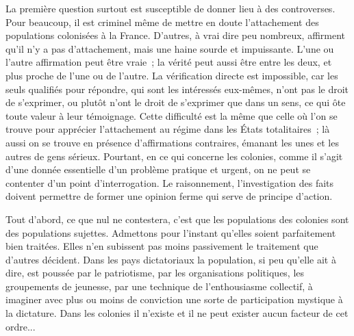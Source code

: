 \documentclass[french,twoside]{book} %
\begin{document}
La première question surtout est susceptible de donner lieu à des contro­verses. Pour beaucoup, il est criminel même de mettre en doute l'attachement des populations colonisées à la France. D'autres, à vrai dire peu nombreux, affirment qu'il n'y a pas d'attachement, mais une haine sourde et impuissante. L'une ou l'autre affirmation peut être vraie ; la vérité peut aussi être entre les deux, et plus proche de l'une ou de l'autre. La vérification directe est impos­sible, car les seuls qualifiés pour répondre, qui sont les intéressés eux-mêmes, n'ont pas le droit de s'exprimer, ou plutôt n'ont le droit de s'exprimer que dans un sens, ce qui ôte toute valeur à leur témoignage. Cette difficulté est la même que celle où l'on se trouve pour apprécier l'attachement au régime dans les États totalitaires ; là aussi on se trouve en présence d'affirmations contraires, émanant les unes et les autres de gens sérieux. Pourtant, en ce qui concerne les colonies, comme il s'agit d'une donnée essentielle d'un problème pratique et urgent, on ne peut se contenter d'un point d'interrogation. Le raisonnement, l'investigation des faits doivent permettre de former une opinion ferme qui serve de principe d'action.\par
Tout d'abord, ce que nul ne contestera, c'est que les populations des colonies sont des populations sujettes. Admettons pour l'instant qu'elles soient parfaitement bien traitées. Elles n'en subissent pas moins passivement le traitement que d'autres décident. Dans les pays dictatoriaux la population, si peu qu'elle ait à dire, est poussée par le patriotisme, par les organisations politiques, les groupements de jeunesse, par une technique de l'enthousiasme collectif, à imaginer avec plus ou moins de conviction une sorte de partici­pation mystique à la dictature. Dans les colonies il n'existe et il ne peut exister aucun facteur de cet ordre...\par
\end{document}
